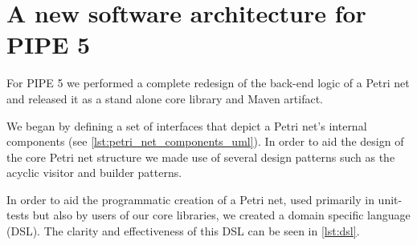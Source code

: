 \section{A new software architecture for PIPE 5}
For PIPE 5 we performed a complete redesign of the back-end logic of a Petri net and released it as a stand alone core library and Maven artifact. 

We began by defining a set of interfaces that depict a Petri net's internal components (see \cref{lst:petri_net_components_uml}). In order to aid the design of the core Petri net structure we made use of several design patterns such as the acyclic visitor and builder patterns.


In order to aid the programmatic creation of a Petri net, used primarily in unit-tests but also by users of our core libraries, we created a domain specific language (DSL). The clarity and effectiveness of this DSL can be seen in \cref{lst:dsl}.


